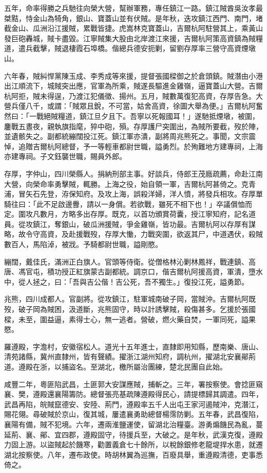 \begin{pinyinscope}
五年，命率得勝之兵馳往向榮大營，幫辦軍務，專任鎮江一路。鎮江賊酋吳汝孝最桀黠，恃金山為犄角，銀山、寶蓋山並有伏賊。是年秋，迭攻鎮江西門、南門，堵截金山、瓜洲沿江援賊，累戰皆捷。虎嵩林克寶蓋山，吉爾杭阿駐營其上，乘黃山發巨砲轟城，賊卡盡毀。江寧賊集大股由北岸渡江來援，吉爾杭阿策高資鎮為賊糧道，遣兵截擊，賊退棲霞石埠橋。偕總兵德安扼剿，留劉存厚率三營守高資煙墩山。

六年春，賊糾悍黨陳玉成、李秀成等來援，提督張國樑御之於倉頭鎮。賊潛由小港出江順流下，城賊突出應，官軍為所乘，賊遂長驅進金雞嶺，逼寶蓋山大營。吉爾杭阿拒，賊未得逞，乃渡江犯儀徵、揚州。五月，賊數萬復犯高資，存厚告急。大營兵僅八千，或謂：「賊眾且銳，不可當，姑舍高資，徐圖大舉為便。」吉爾杭阿奮然曰：「一戰絕賊糧道，鎮江旦夕且下。吾寧以死報國耳！」遂馳抵煙墩，被圍，鏖戰五晝夜，親執旗指麾，猝中砲，殞。存厚護尸突圍出，為賊所要截，歿於陣，並遺骸失之。副都統繃闊投江死。鎮江軍亦潰，副將周兆熊死之。事聞，文宗震悼，追贈吉爾杭阿總督，予一等輕車都尉世職，謚勇烈。於殉難地方建專祠，上海亦建專祠。子文鈺襲世職，賜員外郎。

存厚，字仲山，四川榮縣人。捐納刑部主事。好談兵，侍郎王茂廕疏薦，命赴江南大營，向榮命率勇擊賊，輒勝。上海之役，始自領一軍，吉爾杭阿甚倚之。克青浦，冒矢石先登，洊保知府。及攻上海，誤殺洋婦，洋人憤，將發兵相攻。存厚單騎往曰：「此不足啟邊釁，請以一身償。若欲戰，雖死不相下也！」卒議償恤而定。圍攻凡數月，方略多出存厚。既克，以首功頒賞荷囊，授江寧知府，記名道員。從攻鎮江，奪銀山，破瓜洲援賊，爭金雞嶺，皆功最。吉爾杭阿以存厚有謀略，故令守高資，及赴援戰歿，存厚大慟，力戰突圍，欲返其尸，中道遇伏，殺賊數百人，馬陷淖，被戕。予騎都尉世職，謚剛愍。

繃闊，戴佳氏，滿洲正白旗人。官頭等侍衛。從僧格林沁剿林鳳祥，戰連鎮、高唐、馮官屯，積功授正紅旗蒙古副都統。調京口，偕吉爾杭阿援高資，軍潰，墮水中，從人拯之，曰：「吾與吉公偕！吉公死，吾不獨生。」復投江死，謚勇節。

兆熊，四川成都人。官副將。從攻鎮江，駐軍城南破子岡，當賊沖。吉爾杭阿既歿，破子岡為賊困，汲道斷，兆熊固守，時以計誘擊賊，殺傷甚多。乞援於張國樑，未至，圍益逼，素得士心，無一逃者。營破，燃火藥自焚，一軍同死，謚果愍。

羅遵殿，字澹村，安徽宿松人。道光十五年進士，直隸即用知縣，歷南樂、唐山、清苑諸縣，冀州直隸州，皆有聲績。擢浙江湖州知府，調杭州，擢湖北安襄鄖荊道。遵殿在浙，以捕盜名。至湖北，檄所屬治團練，楚北民團自此始。

咸豐二年，粵匪陷武昌，土匪郭大安謀應賊，捕斬之。三年，署按察使。會捻匪窺襄、樊，遵殿還襄陽籌防。總督張亮基疏陳遵殿得民心，請提標歸其調遣。四年，武昌再陷，皖賊竄德安、安陸、荊門，遵殿率五千人出屯王家河遏賊沖，克潛江，賜花翎。尋破賊於京山，復其城，屢遣襄勇助總督楊霈防剿。五年春，武昌復陷，襄陽有備，賊不犯境。六年，遷兩淮鹽運使，留湖北治糧臺。游勇煽饑民為亂，蔓延荊、襄、鄖、宜四郡，遵殿固守，待援兵至，大破之。是年秋，武漢克復，遵殿力固上游。以盜賊起於饑寒，勸置義倉七十餘所，以稅餘銀修老龍堤捍水患，就遷湖北按察使。八年，遷布政使。時胡林翼為巡撫，百廢具舉，重遵殿清德，吏事悉倚之。


\end{pinyinscope}
